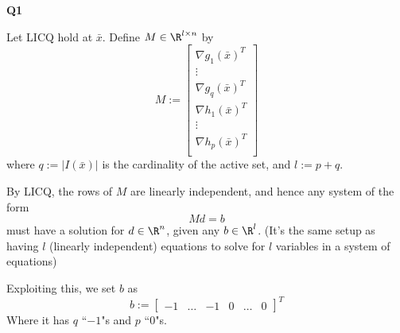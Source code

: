 %

{\large\textbf{Q1}}

Let LICQ hold at $\bar x$. Define $M\in\R^{l\times n}$ by
$$
	M:=\begin{bmatrix}
		\nabla g_1(\bar x)^T \\
		\vdots               \\
		\nabla g_q(\bar x)^T \\
		\nabla h_1(\bar x)^T \\
		\vdots               \\
		\nabla h_p(\bar x)^T \\
	\end{bmatrix}
$$
where $q:=|I(\bar x)|$ is the cardinality of the active set, and $l:=p+q$.

By LICQ, the rows of $M$ are linearly independent, and hence any
system of the form
$$
	Md = b
$$
must have a solution for $d\in\R^n$, given any $b\in\R^l$. (It's the
same setup as having $l$ (linearly independent) equations to solve for
$l$ variables in a system of equations)

Exploiting this, we set $b$ as
$$
	b:=\begin{bmatrix}
		-1 & \ldots & -1 & 0 & \ldots & 0
	\end{bmatrix}^T
$$
Where it has $q$ ``$-1$"s and $p$ ``0"s.

